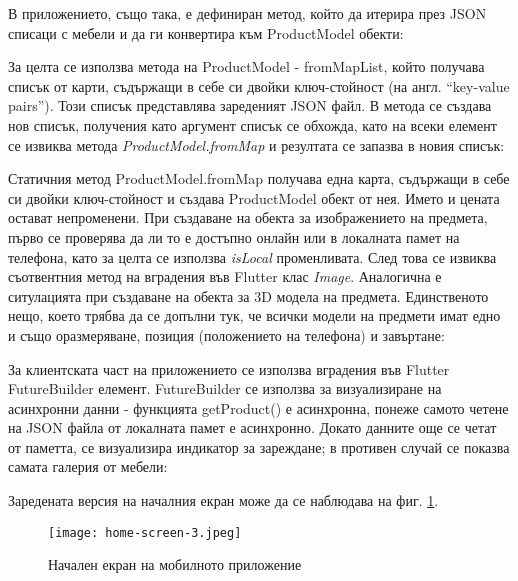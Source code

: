 В приложението, също така, е дефиниран метод, който да итерира през JSON списаци с мебели и да ги конвертира към ProductModel обекти:


За целта се използва метода на ProductModel - fromMapList, който получава списък от карти, съдържащи в себе си двойки ключ-стойност (на англ. ``key-value pairs''). Този списък представлява зареденият JSON файл. В метода се създава нов списък, получения като аргумент списък се обхожда, като на всеки елемент се извиква метода \emph{ProductModel.fromMap} и резултата се запазва в новия списък:


Статичния метод ProductModel.fromMap получава една карта, съдържащи в себе си двойки ключ-стойност и създава ProductModel обект от нея. Името и цената остават непроменени. При създаване на обекта за изображението на предмета, първо се проверява да ли то е достъпно онлайн или в локалната памет на телефона, като за целта се използва \emph{isLocal} променливата. След това се извиква съотвентния метод на вградения във Flutter клас \emph{Image}. Аналогична е ситулацията при създаване на обекта за 3D модела на предмета. Единственото нещо, което трябва да се допълни тук, че всички модели на предмети имат едно и също оразмеряване, позиция (положението на телефона) и завъртане:


За клиентската част на приложението се използва вградения във Flutter FutureBuilder елемент. FutureBuilder се използва за визуализиране на асинхронни данни - функцията getProduct() е асинхронна, понеже самото четене на JSON файла от локалната памет е асинхронно. Докато данните още се четат от паметта, се визуализира индикатор за зареждане; в противен случай се показва самата галерия от мебели:


Заредената версия на началния екран може да се наблюдава на фиг. \ref{fig:home-screen-in-3}.

\begin{figure}[H]
    \texttt{[image: home-screen-3.jpeg]}
    \centering
    \caption{Начален екран на мобилното приложение}
    \label{fig:home-screen-in-3}
\end{figure}
